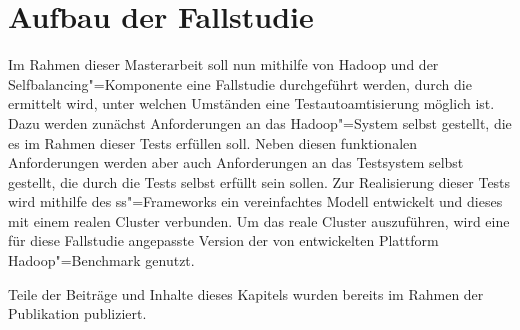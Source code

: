 \chapter{Aufbau der Fallstudie}
\label{sec:fallstudie}

Im Rahmen dieser Masterarbeit soll nun mithilfe von Hadoop und der Selfbalancing"=Komponente eine Fallstudie durchgeführt werden, durch die ermittelt wird, unter welchen Umständen eine Testautoamtisierung möglich ist.
Dazu werden zunächst Anforderungen an das Hadoop"=System selbst gestellt, die es im Rahmen dieser Tests erfüllen soll.
Neben diesen funktionalen Anforderungen werden aber auch Anforderungen an das Testsystem selbst gestellt, die durch die Tests selbst erfüllt sein sollen.
Zur Realisierung dieser Tests wird mithilfe des \ac{ss}"=Frameworks ein vereinfachtes Modell entwickelt und dieses mit einem realen Cluster verbunden.
Um das reale Cluster auszuführen, wird eine für diese Fallstudie angepasste Version der von \citeauthor{zhang2016} entwickelten Plattform Hadoop"=Benchmark genutzt.

Teile der Beiträge und Inhalte dieses Kapitels wurden bereits im Rahmen der Publikation \cite{Eberhardinger2018} publiziert.








